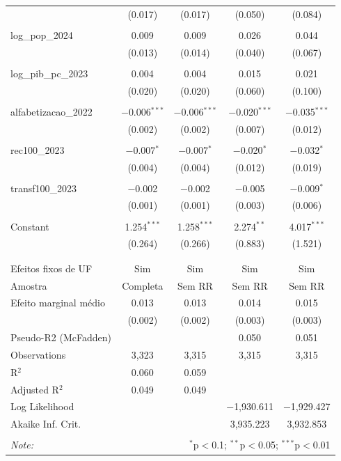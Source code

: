 \begin{table}[!htbp]
\begin{tabular}{@{\extracolsep{5pt}}lcccc}
  & (0.017) & (0.017) & (0.050) & (0.084) \\ 
  & & & & \\ 
 log\_pop\_2024 & 0.009 & 0.009 & 0.026 & 0.044 \\ 
  & (0.013) & (0.014) & (0.040) & (0.067) \\ 
  & & & & \\ 
 log\_pib\_pc\_2023 & 0.004 & 0.004 & 0.015 & 0.021 \\ 
  & (0.020) & (0.020) & (0.060) & (0.100) \\ 
  & & & & \\ 
 alfabetizacao\_2022 & $-$0.006$^{***}$ & $-$0.006$^{***}$ & $-$0.020$^{***}$ & $-$0.035$^{***}$ \\ 
  & (0.002) & (0.002) & (0.007) & (0.012) \\ 
  & & & & \\ 
 rec100\_2023 & $-$0.007$^{*}$ & $-$0.007$^{*}$ & $-$0.020$^{*}$ & $-$0.032$^{*}$ \\ 
  & (0.004) & (0.004) & (0.012) & (0.019) \\ 
  & & & & \\ 
 transf100\_2023 & $-$0.002 & $-$0.002 & $-$0.005 & $-$0.009$^{*}$ \\ 
  & (0.001) & (0.001) & (0.003) & (0.006) \\ 
  & & & & \\ 
 Constant & 1.254$^{***}$ & 1.258$^{***}$ & 2.274$^{**}$ & 4.017$^{***}$ \\ 
  & (0.264) & (0.266) & (0.883) & (1.521) \\ 
  & & & & \\ 
\hline \\[-1.8ex] 
Efeitos fixos de UF & Sim & Sim & Sim & Sim \\ 
Amostra & Completa & Sem RR & Sem RR & Sem RR \\ 
Efeito marginal médio & 0.013 & 0.013 & 0.014 & 0.015 \\ 
 & (0.002) & (0.002) & (0.003) & (0.003) \\ 
Pseudo-R2 (McFadden) &  &  & 0.050 & 0.051 \\ 
Observations & 3,323 & 3,315 & 3,315 & 3,315 \\ 
R$^{2}$ & 0.060 & 0.059 &  &  \\ 
Adjusted R$^{2}$ & 0.049 & 0.049 &  &  \\ 
Log Likelihood &  &  & $-$1,930.611 & $-$1,929.427 \\ 
Akaike Inf. Crit. &  &  & 3,935.223 & 3,932.853 \\ 
\hline 
\hline \\[-1.8ex] 
\textit{Note:}  & \multicolumn{4}{r}{$^{*}$p$<$0.1; $^{**}$p$<$0.05; $^{***}$p$<$0.01} \\ 
\end{tabular} 
\end{table} 
